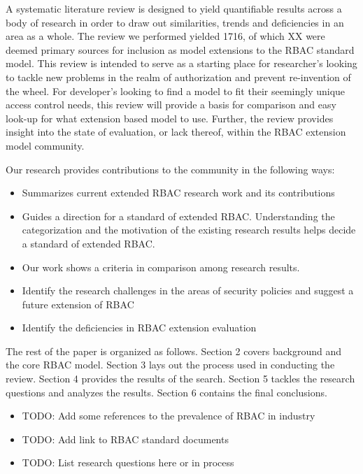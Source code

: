 A systematic literature review is designed to yield quantifiable results across a body of research in order to draw out similarities, trends and deficiencies in an area as a whole.  The review we performed yielded 1716, of which XX were deemed primary sources for inclusion as model extensions to the RBAC standard model.  This review is intended to serve as a starting place for researcher's looking to tackle new problems in the realm of authorization and prevent re-invention of the wheel. For developer's looking to find a model to fit their seemingly unique access control needs, this review will provide a basis for comparison and easy look-up for what extension based model to use.  Further, the review provides insight into the state of evaluation, or lack thereof, within the RBAC extension model community.

Our research provides contributions to the community in the following ways:

\begin{itemize}
\item Summarizes current extended RBAC research work and its contributions
\item Guides a direction for a standard of extended RBAC. Understanding the categorization and the motivation of the existing research results helps decide a standard of extended RBAC.
\item Our work shows a criteria in comparison among research results.
\item Identify the research challenges in the areas of security policies and suggest a future extension of RBAC
\item Identify the deficiencies in RBAC extension evaluation
\end{itemize}

The rest of the paper is organized as follows.  Section 2 covers background and the core RBAC model. Section 3 lays out the process used in conducting the review. Section 4 provides the results of the search. Section 5 tackles the research questions and analyzes the results.  Section 6 contains the final conclusions.

\begin{itemize}
\item TODO: Add some references to the prevalence of RBAC in industry
\item TODO: Add link to RBAC standard documents
\item TODO: List research questions here or in process
\end{itemize}
